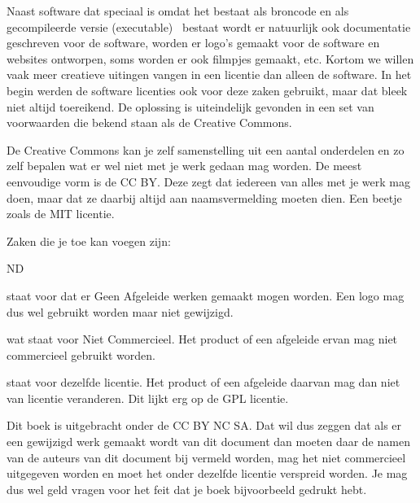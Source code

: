 Naast software dat speciaal is omdat het bestaat als broncode en als gecompileerde versie (executable) \ bestaat wordt
er natuurlijk ook documentatie geschreven voor de software, worden er logo's gemaakt voor de software en websites
ontworpen, soms worden er ook filmpjes gemaakt, etc. Kortom we willen vaak meer creatieve uitingen vangen in een
licentie dan alleen de software. In het begin werden de software licenties ook voor deze zaken gebruikt, maar dat bleek
niet altijd toereikend. De oplossing is uiteindelijk gevonden in een set van voorwaarden die bekend staan als de
Creative Commons.\par

De Creative Commons kan je zelf samenstelling uit een aantal onderdelen en zo zelf bepalen wat er wel niet met je werk
gedaan mag worden. De meest eenvoudige vorm is de CC BY. Deze zegt dat iedereen van alles met je werk mag doen, maar
dat ze daarbij altijd aan naamsvermelding moeten dien. Een beetje zoals de MIT licentie.\par

Zaken die je toe kan voegen zijn:

\begin{labeling}{ND}
\item [ND] staat voor dat er Geen Afgeleide werken gemaakt mogen worden. Een logo mag dus wel gebruikt worden maar niet gewijzigd.
\item [NC] wat staat voor Niet Commercieel. Het product of een afgeleide ervan mag niet commercieel gebruikt worden.
\item [SA] staat voor dezelfde licentie. Het product of een afgeleide daarvan mag dan niet van licentie veranderen. Dit lijkt erg op de GPL licentie.
\end{labeling}

Dit boek is uitgebracht onder de CC BY NC SA. Dat wil dus zeggen dat als er een gewijzigd werk gemaakt wordt van dit
document dan moeten daar de namen van de auteurs van dit document bij vermeld worden, mag het niet commercieel
uitgegeven worden en moet het onder dezelfde licentie verspreid worden. Je mag dus wel geld vragen voor het feit dat je
boek bijvoorbeeld gedrukt hebt.

